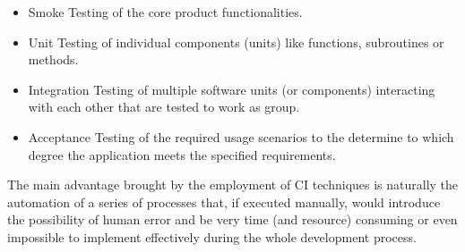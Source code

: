 \begin{itemize}
    \item Smoke Testing of the core product functionalities.
    \item Unit Testing of individual components (units) like functions, subroutines or methods. 
    \item Integration Testing of multiple software units (or components) interacting with each other that are tested to work as group.
    \item Acceptance Testing of the required usage scenarios to the determine to which degree the application meets the specified requirements.
\end{itemize}

The main advantage brought by the employment of CI techniques is naturally the automation of a series of processes that, if executed manually, would introduce the possibility of human error and be very time (and resource) consuming or even impossible to implement effectively during the whole development process. 